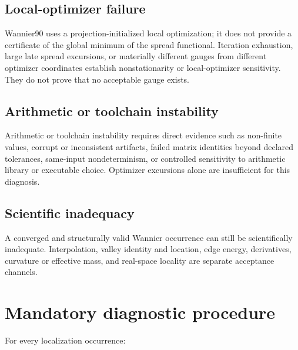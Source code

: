 \documentclass[11pt]{article}
\begin{document}
\subsection{Local-optimizer failure}

Wannier90 uses a projection-initialized local optimization; it does not provide a
certificate of the global minimum of the spread functional.  Iteration exhaustion,
large late spread excursions, or materially different gauges from different optimizer
coordinates establish nonstationarity or local-optimizer sensitivity.  They do not prove
that no acceptable gauge exists.

\subsection{Arithmetic or toolchain instability}

Arithmetic or toolchain instability requires direct evidence such as non-finite values,
corrupt or inconsistent artifacts, failed matrix identities beyond declared tolerances,
same-input nondeterminism, or controlled sensitivity to arithmetic library or executable
choice.  Optimizer excursions alone are insufficient for this diagnosis.

\subsection{Scientific inadequacy}

A converged and structurally valid Wannier occurrence can still be scientifically
inadequate.  Interpolation, valley identity and location, edge energy, derivatives,
curvature or effective mass, and real-space locality are separate acceptance channels.

\section{Mandatory diagnostic procedure}

For every localization occurrence:
\end{document}
